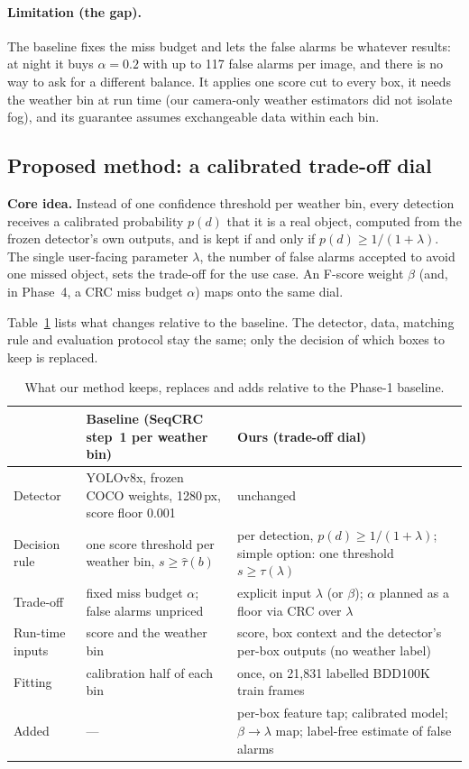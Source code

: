 \paragraph{Limitation (the gap).} The baseline fixes the miss budget and lets the false alarms be whatever
results: at night it buys $\alpha = 0.2$ with up to 117 false alarms per image, and there is no way to ask for a
different balance. It applies one score cut to every box, it needs the weather bin at run time (our camera-only
weather estimators did not isolate fog), and its guarantee assumes exchangeable data within each bin.

\subsection{Proposed method: a calibrated trade-off dial}\label{sec:method-idea}

\textbf{Core idea.} Instead of one confidence threshold per weather bin, every detection receives a calibrated
probability $p(d)$ that it is a real object, computed from the frozen detector's own outputs, and is kept if and
only if $p(d) \ge 1/(1+\lambda)$. The single user-facing parameter $\lambda$, the number of false alarms
accepted to avoid one missed object, sets the trade-off for the use case. An F-score weight $\beta$ (and, in
Phase~4, a CRC miss budget $\alpha$) maps onto the same dial.

Table~\ref{tab:changes} lists what changes relative to the baseline. The detector, data, matching rule and
evaluation protocol stay the same; only the decision of which boxes to keep is replaced.

\begin{table}[t]
\centering\small
\caption{What our method keeps, replaces and adds relative to the Phase-1 baseline.}
\label{tab:changes}
\begin{tabularx}{\textwidth}{@{}>{\raggedright\arraybackslash}p{2.6cm}>{\raggedright\arraybackslash}X>{\raggedright\arraybackslash}X@{}}
\toprule
 & Baseline (SeqCRC step~1 per weather bin) & Ours (trade-off dial) \\
\midrule
Detector & YOLOv8x, frozen COCO weights, 1280\,px, score floor 0.001 & unchanged \\
Decision rule & one score threshold per weather bin, $s \ge \hat\tau(b)$ & per detection, $p(d) \ge 1/(1+\lambda)$; simple option: one threshold $s \ge \tau(\lambda)$ \\
Trade-off & fixed miss budget $\alpha$; false alarms unpriced & explicit input $\lambda$ (or $\beta$); $\alpha$ planned as a floor via CRC over $\lambda$ \\
Run-time inputs & score and the weather bin & score, box context and the detector's per-box outputs (no weather label) \\
Fitting & calibration half of each bin & once, on 21,831 labelled BDD100K train frames \\
Added & --- & per-box feature tap; calibrated model; $\beta \to \lambda$ map; label-free estimate of false alarms \\
\bottomrule
\end{tabularx}
\end{table}

